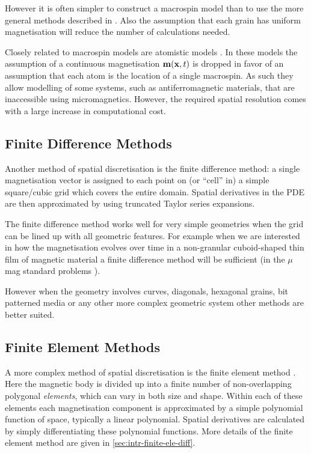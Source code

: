 However it is often simpler to construct a macrospin model than to use the more general methods described in .
Also the assumption that each grain has uniform magnetisation will reduce the number of calculations needed.

Closely related to macrospin models are atomistic models \cite{Evans2014}.
In these models the assumption of a continuous magnetisation $\mathbf{m}(\mathbf{x}, t)$ is dropped in favor of an assumption that each atom is the location of a single macrospin.
As such they allow modelling of some systems, such as antiferromagnetic materials, that are inaccessible using micromagnetics.
However, the required spatial resolution comes with a large increase in computational cost.


\subsection{Finite Difference Methods}
\label{sec:sd-finite-diff-meth}

Another method of spatial discretisation is the finite difference method: a single magnetisation vector is assigned to each point on (or ``cell'' in) a simple square/cubic grid which covers the entire domain.
Spatial derivatives in the PDE are then approximated by using truncated Taylor series expansions.

The finite difference method works well for very simple geometries when the grid can be lined up with all geometric features.
For example when we are interested in how the magnetisation evolves over time in a non-granular cuboid-shaped thin film of magnetic material a finite difference method will be sufficient (\eg in the $\mu$mag standard problems \cite{mumag-website}).

However when the geometry involves curves, diagonals, hexagonal grains, bit patterned media or any other more complex geometric system other methods are better suited.


\subsection{Finite Element Methods}
\label{sec:sd-finite-elem-meth}

A more complex method of spatial discretisation is the finite element method \cite{HowardElmanDavidSilvester2006}.
Here the magnetic body is divided up into a finite number of non-overlapping polygonal \emph{elements}, which can vary in both size and shape.
Within each of these elements each magnetisation component is approximated by a simple polynomial function of space, typically a linear polynomial.
Spatial derivatives are calculated by simply differentiating these polynomial functions.
More details of the finite element method are given in \cref{sec:intr-finite-ele-diff}.

